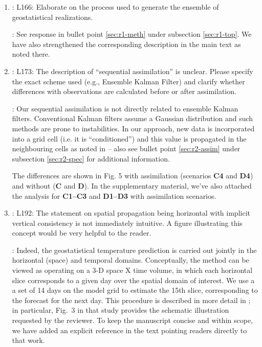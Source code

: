 \documentclass[a4paper]{article}
\begin{document}
\begin{answers}
\begin{enumerate}
\item \reply: L166: Elaborate on the process used to generate the
  ensemble of geostatistical realizations.

  \action: See response in bullet point \ref{sec:r1-meth} under
  subsection \ref{sec:r1-top}. We have also strengthened the
  corresponding description in the main text as noted there.

\item \reply: L173: The description of “sequential assimilation” is
  unclear. Please specify the exact scheme used (e.g., Ensemble Kalman
  Filter) and clarify whether differences with observations are
  calculated before or after assimilation.

  \action: Our sequential assimilation is not directly related to
  ensemble Kalman filters. Conventional Kalman filters assume a
  Gaussian distribution and such methods are prone to
  instabilities. In our approach, new data is incorporated into a grid
  cell (i.e. it is ``conditioned'') and this value is propagated in
  the neighbouring cells as noted in \cite{duarte2025} -- also see
  bullet point \ref{sec:r2-assim} under subsection \ref{sec:r2-spec}
  for additional information.
  
  The differences are shown in Fig. 5 with assimilation (scenarios
  \textbf{C4} and \textbf{D4}) and without (\textbf{C} and
  \textbf{D}). In the supplementary material, we've also attached the
  analysis for \textbf{C1--C3} and \textbf{D1--D3} with assimilation
  scenarios.
  


\item \reply: L192: The statement on spatial propagation being
  horizontal with implicit vertical consistency is not immediately
  intuitive. A figure illustrating this concept would be very helpful to
  the reader.

  \action: Indeed, the geostatistical temperature prediction is
  carried out jointly in the horizontal (space) and temporal
  domains. Conceptually, the method can be viewed as operating on a
  3-D space X time volume, in which each horizontal slice corresponds
  to a given day over the spatial domain of interest. We use a a set
  of 14 days on the model grid to estimate the 15th slice,
  corresponding to the forecast for the next day. This procedure is
  described in more detail in \cite{duarte2025}; in particular, Fig.~3
  in that study provides the schematic illustration requested by the
  reviewer. To keep the manuscript concise and within scope, we have
  added an explicit reference in the text pointing readers directly to
  that work.
  

\end{enumerate}
\end{answers}
\end{document}
